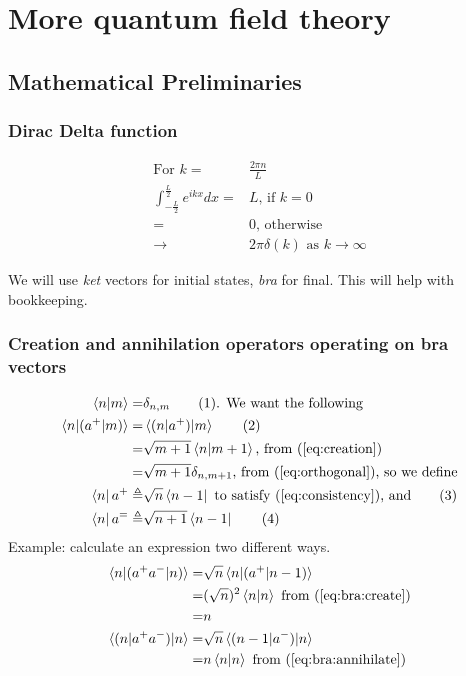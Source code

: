 \documentclass[]{article}
\newcommand\numberthis{\addtocounter{equation}{1}\tag{\theequation}}
\begin{document}
\section{More quantum field theory}

\subsection{Mathematical Preliminaries}

\subsubsection{Dirac Delta function}

\begin{align*}
	\text{For } k =& \frac{2 \pi n}{L}\\
	\int_{-\frac{L}{2}}^{\frac{L}{2}} e^{ikx} dx =& L \text{, if $k =0$}\\
	=& 0 \text{, otherwise}\\
	\rightarrow& 2 \pi \delta(k) \text{ as $k \rightarrow \infty$}
\end{align*}

We will use \emph{ket} vectors for initial states, \emph{bra} for final. This will help with bookkeeping.

\subsubsection{Creation and annihilation operators operating on bra vectors}

\begin{align*}
	\braket{n|m} =& \delta_{n,m}\numberthis \label{eq:orthogonal} \text{. We want the following}\\
	\braket{n|(a^+|m)} =& \braket{(n|a^+)|m}  \numberthis \label{eq:consistency}\\
	=& \sqrt{m+1} \braket{n|m+1} \text{, from (\ref{eq:creation})}\\
	=& \sqrt{m+1} \delta_{n,m+1} \text{, from (\ref{eq:orthogonal})} \text{, so we define}\\
	\bra{n} a^+ \triangleq & \sqrt{n} \bra{n-1} \text{ to satisfy (\ref{eq:consistency}), and} \numberthis \label{eq:bra:create}\\
	\bra{n} a^= \triangleq & \sqrt{n+1} \bra{n-1} \numberthis \label{eq:bra:annihilate}
\end{align*}
Example: calculate an expression two different ways.
\begin{align*}
	\braket{n|(a^+a^-|n)} =& \sqrt{n}\braket{n|(a^+|n-1)}\\
	=& (\sqrt{n})^2 \braket{n|n} \text{ from (\ref{eq:bra:create})}\\
	=& n\\
	\braket{(n|a^+a^-)|n} =& \sqrt{n} \braket{(n-1|a^-)|n}\\
	=& n \braket{n|n} \text{ from (\ref{eq:bra:annihilate})}
\end{align*}
\end{document}
